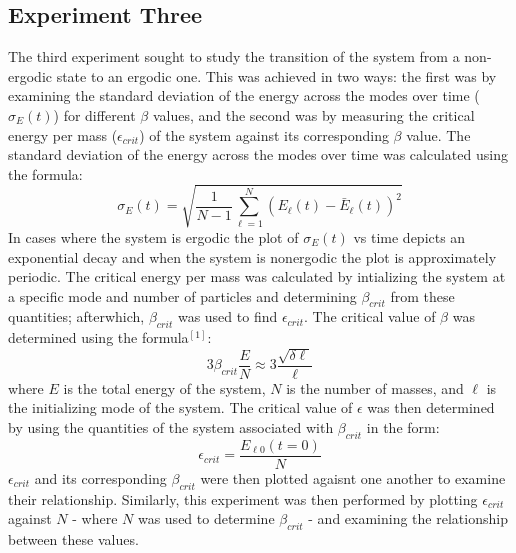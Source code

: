 \documentclass[twocolumn]{article}
\begin{document}
\subsection{Experiment Three}
The third experiment sought to study the transition of the system from a non-ergodic state to an ergodic one. This was achieved in two ways: the first was by examining the standard deviation of the energy across the modes over time ($\sigma_E(t)$) for different $\beta$ values, and the second was by measuring the critical energy per mass ($\epsilon_{crit}$) of the system against its corresponding $\beta$ value. The standard deviation of the energy across the modes over time was calculated using the formula:
\begin{equation}
	\sigma_E(t)=\sqrt{\frac{1}{N-1}\sum_{\ell=1}^{N}\left(E_\ell(t)-\bar{E}_\ell(t)\right)^2}
\end{equation}
In cases where the system is ergodic the plot of $\sigma_E(t)$ vs time depicts an exponential decay and when the system is nonergodic the plot is approximately periodic. The critical energy per mass was calculated by intializing the system at a specific mode and number of particles and determining $\beta_{crit}$ from these quantities; afterwhich, $\beta_{crit}$ was used to find $\epsilon_{crit}$. The critical value of $\beta$ was determined using the formula$^{[1]}$:
\begin{equation}
	3\beta_{crit}\frac{E}{N} \approx 3 \frac{\sqrt{\delta\ell}}{\ell}
\end{equation}
where $E$ is the total energy of the system, $N$ is the number of masses, and $\ell$ is the initializing mode of the system. The critical value of $\epsilon$ was then determined by using the quantities of the system associated with $\beta_{crit}$ in the  form:
\begin{equation}
	\epsilon_{crit}=\frac{E_{\ell0}(t=0)}{N}
\end{equation}
$\epsilon_{crit}$ and its corresponding $\beta_{crit}$ were then plotted agaisnt one another to examine their relationship. Similarly, this experiment was then performed by plotting $\epsilon_{crit}$ against $N$ - where $N$ was used to determine $\beta_{crit}$ - and examining the relationship between these values.
\end{document}
